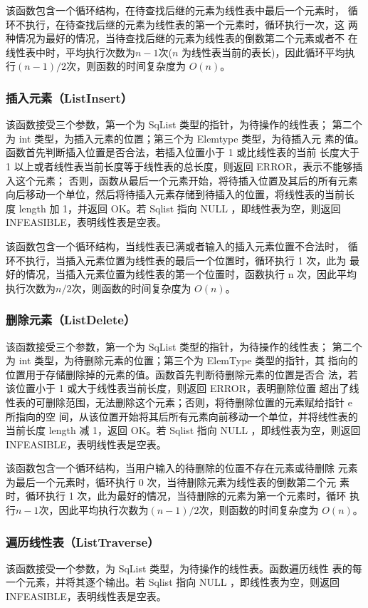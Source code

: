 \documentclass[supercite]{Experimental_Report}
\theoremstyle{definition}
\begin{document}
该函数包含一个循环结构，在待查找后继的元素为线性表中最后一个元素时，
循环不执行，在待查找后继的元素为线性表的第一个元素时，循环执行一次，这
两种情况为最好的情况，当待查找后继的元素为线性表的倒数第二个元素或者不
在线性表中时，平均执行次数为$n-1$次($n$ 为线性表当前的表长)，因此循环平均执行$(n-1)/2$次，则函数的时间复杂度为 $O(n)$。

\subsubsection{插入元素（ListInsert）}
该函数接受三个参数，第一个为 SqList 类型的指针，为待操作的线性表；
第二个为 int 类型，为插入元素的位置；第三个为 Elemtype 类型，为待插入元
素的值。函数首先判断插入位置是否合法，若插入位置小于 1 或比线性表的当前
长度大于 1 以上或者线性表当前长度等于线性表的总长度，则返回 ERROR，表示不能够插入这个元素；
否则，函数从最后一个元素开始，将待插入位置及其后的所有元素
向后移动一个单位，然后将待插入元素存储到待插入的位置，将线性表的当前长
度 length 加 1，并返回 OK。若 Sqlist 指向 NULL ，即线性表为空，则返回INFEASIBLE，表明线性表是空表。

该函数包含一个循环结构，当线性表已满或者输入的插入元素位置不合法时，
循环不执行，当插入元素位置为线性表的最后一个位置时，循环执行 1 次，此为
最好的情况，当插入元素位置为线性表的第一个位置时，函数执行 n 次，因此平均执行次数为$n/2$次，则函数的时间复杂度为 $O(n)$。

\subsubsection{删除元素（ListDelete）}
该函数接受三个参数，第一个为 SqList 类型的指针，为待操作的线性表；
第二个为 int 类型，为待删除元素的位置；第三个为 ElemType 类型的指针，其
指向的位置用于存储删除掉的元素的值。函数首先判断待删除元素的位置是否合
法，若该位置小于 1 或大于线性表当前长度，则返回 ERROR，表明删除位置
超出了线性表的可删除范围，无法删除这个元素；否则，将待删除位置的元素赋给指针 e 所指向的空
间，从该位置开始将其后所有元素向前移动一个单位，并将线性表的当前长度
length 减 1，返回 OK。若 Sqlist 指向 NULL ，即线性表为空，则返回INFEASIBLE，表明线性表是空表。

该函数包含一个循环结构，当用户输入的待删除的位置不存在元素或待删除
元素为最后一个元素时，循环执行 0 次，当待删除元素为线性表的倒数第二个元
素时，循环执行 1 次，此为最好的情况，当待删除的元素为第一个元素时，循环
执行$n-1$次，因此平均执行次数为$(n-1)/2$次，则函数的时间复杂度为 $O(n)$。

\subsubsection{遍历线性表（ListTraverse）}
该函数接受一个参数，为 SqList 类型，为待操作的线性表。函数遍历线性
表的每一个元素，并将其逐个输出。若 Sqlist 指向 NULL ，即线性表为空，则返回INFEASIBLE，表明线性表是空表。
\end{document}
